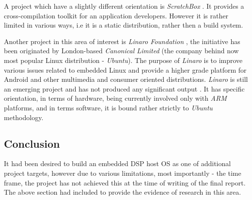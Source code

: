   A project which have a slightly different orientation is
 \emph{ScratchBox} \cite{links:sbox:homepage}. It provides
 a cross-compilation toolkit for an application developers.
 However it is rather limited in various ways, i.e it is a
 static distribution, rather then a build system.
 
  Another project in this area of interest is \emph{Linaro Foundation}
 \cite{links:linaro:about}, the initiative has been originated by
 London-based \emph{Canonical Limited} (the company behind now most
 popular Linux distribution - \emph{Ubuntu}).
 The purpose of \emph{Linaro} is to improve various issues related to
 embedded Linux and provide a higher grade platform for Android and
 other multimedia and consumer oriented distributions. \emph{Linaro} is
 still an emerging project and has not produced any significant output
 \cite{links:linaro:homepage}. It has specific orientation, in terms of
 hardware, being currently involved only with \emph{ARM} platforms,
 and in terms software, it is bound rather strictly to \emph{Ubuntu}
 methodology.

\subsection{Conclusion}

  It had been desired to build an embedded DSP host OS as one of
 additional project targets, however due to various limitations, most
 importantly - the time frame, the project has not achieved this at
 the time of writing of the final report. The above section had included
 to provide the evidence of research in this area.






